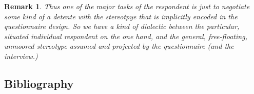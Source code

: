 \documentclass[11pt,twoside]{article}
\newtheorem{remark}{Remark}
\begin{document}
\begin{remark}
  Thus one of the major tasks of the respondent is just to negotiate
  some kind of a \textit{detente} with the stereotpye that is
  implicitly encoded in the questionnaire design.  So we have a kind
  of dialectic between the particular, situated individual respondent
  on the one hand, and the general, free-floating, unmoored stereotype
  assumed and projected by the questionnaire (and the interview.)
\end{remark}

\clearpage
\appendix
\begin{appendices}
\section{Bibliography}
\end{appendices}
\end{document}

